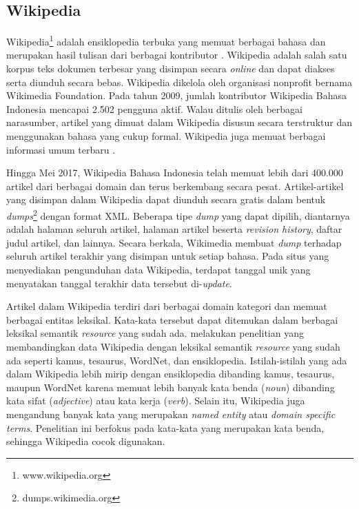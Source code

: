 \subsection{Wikipedia}
Wikipedia\footnote{www.wikipedia.org} adalah ensiklopedia terbuka yang memuat berbagai bahasa dan merupakan hasil tulisan dari berbagai kontributor \citep{denoyer2006wikipedia}. Wikipedia adalah salah satu korpus teks dokumen terbesar yang disimpan secara \textit{online} dan dapat diakses serta diunduh secara bebas. Wikipedia dikelola oleh organisasi nonprofit bernama Wikimedia Foundation. Pada tahun 2009, jumlah kontributor Wikipedia Bahasa Indonesia mencapai 2.502 pengguna aktif. Walau ditulis oleh berbagai narasumber, artikel yang dimuat dalam Wikipedia disusun secara terstruktur dan menggunakan bahasa yang cukup formal. Wikipedia juga memuat berbagai informasi umum terbaru \citep{arnold2014extracting}.

Hingga Mei 2017, Wikipedia Bahasa Indonesia telah memuat lebih dari 400.000 artikel dari berbagai domain dan terus berkembang secara pesat. Artikel-artikel yang disimpan dalam Wikipedia dapat diunduh secara gratis dalam bentuk \textit{dumps}\footnote{dumps.wikimedia.org} dengan format XML. Beberapa tipe \textit{dump} yang dapat dipilih, diantarnya adalah halaman seluruh artikel, halaman artikel beserta \textit{revision history}, daftar judul artikel, dan lainnya. Secara berkala, Wikimedia membuat \textit{dump} terhadap seluruh artikel terakhir yang disimpan untuk setiap bahasa. Pada situs yang menyediakan pengunduhan data Wikipedia, terdapat tanggal unik yang menyatakan tanggal terakhir data tersebut di-\textit{update}.

Artikel dalam Wikipedia terdiri dari berbagai domain kategori dan memuat berbagai entitas leksikal. Kata-kata tersebut dapat ditemukan dalam berbagai leksikal semantik \textit{resource} yang sudah ada. \cite{zesch2007analyzing} melakukan penelitian yang membandingkan data Wikipedia dengan leksikal semantik \textit{resource} yang sudah ada seperti kamus, tesaurus, WordNet, dan ensiklopedia. Istilah-istilah yang ada dalam Wikipedia lebih mirip dengan ensiklopedia dibanding kamus, tesaurus, maupun WordNet karena memuat lebih banyak  kata benda (\textit{noun}) dibanding kata sifat (\textit{adjective}) atau kata kerja (\textit{verb}). Selain itu, Wikipedia juga mengandung banyak kata yang merupakan \textit{named entity} atau \textit{domain specific terms}. Penelitian ini berfokus pada kata-kata yang merupakan kata benda, sehingga Wikipedia cocok digunakan. 

